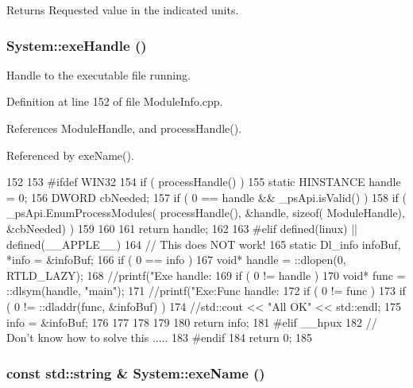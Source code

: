 \begin{DoxyReturn}{Returns}
Requested value in the indicated units. 
\end{DoxyReturn}
\hypertarget{namespaceSystem_a89399871d8d0f573f39f97f7f4a6320b}{
\subsubsection[{exeHandle}]{ System::exeHandle ()}}
\label{namespaceSystem_a89399871d8d0f573f39f97f7f4a6320b}


Handle to the executable file running. 

Definition at line 152 of file ModuleInfo.cpp.

References ModuleHandle, and processHandle().

Referenced by exeName().


\begin{DoxyCode}
152                                        {
153 #ifdef WIN32
154   if ( processHandle() )    {
155     static HINSTANCE handle = 0;
156     DWORD   cbNeeded;
157     if ( 0 == handle && _psApi.isValid() )    {
158       if ( _psApi.EnumProcessModules( processHandle(), &handle, sizeof(
      ModuleHandle), &cbNeeded) )   {
159       }
160     }
161     return handle;
162   }
163 #elif defined(linux) || defined(__APPLE__)
164   // This does NOT work!
165   static Dl_info infoBuf, *info = &infoBuf;
166   if ( 0 == info ) {
167     void* handle = ::dlopen(0, RTLD_LAZY);
168     //printf("Exe handle:%
169     if ( 0 != handle ) {
170       void* func = ::dlsym(handle, "main");
171       //printf("Exe:Func handle:%
172       if ( 0 != func ) {
173         if ( 0 != ::dladdr(func, &infoBuf) ) {
174             //std::cout << "All OK" << std::endl;
175           info = &infoBuf;
176         }
177       }
178     }
179   }
180   return info;
181 #elif __hpux
182   // Don't know how to solve this .....
183 #endif
184   return 0;
185 }
\end{DoxyCode}
\hypertarget{namespaceSystem_aff38aaecd202e69eab2707a36adc8df8}{
\subsubsection[{exeName}]{\setlength{\rightskip}{0pt plus 5cm}const std::string \& System::exeName ()}}
\label{namespaceSystem_aff38aaecd202e69eab2707a36adc8df8}



